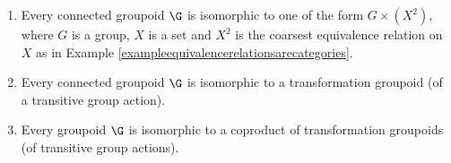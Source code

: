 \begin{theorem}\label{theoremclassificationofgroupoids}
\begin{enumerate}
\item[(a)] Every connected groupoid $\G$ is isomorphic to one of the form $G\times(X^2)$, where $G$ is a group, $X$ is a set and $X^2$ is the coarsest equivalence relation on $X$ as in Example \ref{exampleequivalencerelationsarecategories}.
\item[(b)] Every connected groupoid $\G$ is isomorphic to a transformation groupoid (of a transitive group action).
\item[(c)] Every groupoid $\G$ is isomorphic to a coproduct of transformation groupoids (of transitive group actions).
\end{enumerate}
\end{theorem}
